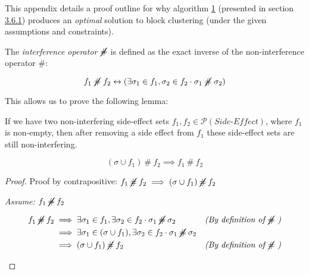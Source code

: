 \label{sec:E}

This appendix details a proof outline for why algorithm \hyperref[alg:one]{1} (presented in section \hyperref[sec:3.6.1]{3.6.1}) produces an \textit{optimal} solution to block clustering (under the given assumptions and constraints).

The \textit{interference operator} \( \cancel{\#} \) is defined as the exact inverse of the non-interference operator \( \# \):


\[ f_1 \; \cancel{\#} \; f_2 \leftrightarrow (\exists \sigma_1 \in f_1, \sigma_2 \in f_2 \cdot \sigma_1 \; \cancel{\#} \; \sigma_2) \]

This allows us to prove the following lemma:

\setcounter{theorem}{0}

\begin{lemma}
  If we have two non-interfering side-effect sets \( f_1, f_2 \in \mathscr{P}(\mathit{Side\text{-}Effect})\), where \( f_1 \) is non-empty, then after removing a side effect from \( f_1 \) these side-effect sets are still non-interfering.
\label{lemma:one}\end{lemma}

\[ (\sigma \cup f_1) \: \# \: f_2 \implies f_1 \: \# \: f_2 \]


\begin{proof}
  Proof by contrapositive: \( f_1 \: \cancel{\#} \: f_2 \implies (\sigma \cup f_1) \: \cancel{\#}  \: f_2\)

  \begin{adjustwidth}{1.5em}{0em}
    \textit{Assume:} \( f_1 \: \cancel{\#} \: f_2 \)

    \vspace{-2mm}

    \begin{align*}
      f_1 \: \cancel{\#} \: f_2 & \implies \exists \sigma_1 \in f_1, \exists \sigma_2 \in f_2 \cdot \sigma_1 \: \cancel{\#} \: \sigma_2               &  & \textit{(By definition of \(  \cancel{\#} \) )} \\
                                & \implies \exists \sigma_1 \in (\sigma \cup f_1), \exists \sigma_2 \in f_2 \cdot \sigma_1 \: \cancel{\#} \: \sigma_2                                                      \\
                                & \implies (\sigma \cup f_1) \: \cancel{\#} \: f_2                                                                    &  & \textit{(By definition of \( \cancel{\#} \) )}  \\
    \end{align*}
  \end{adjustwidth}
\end{proof}


